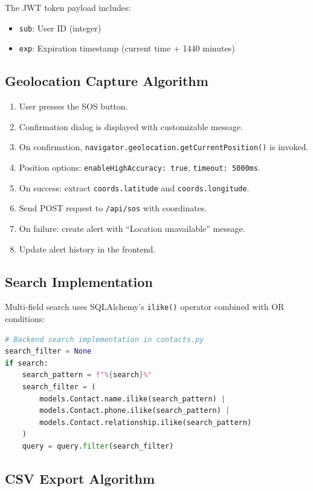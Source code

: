 The JWT token payload includes:
\begin{itemize}
  \item \texttt{sub}: User ID (integer)
  \item \texttt{exp}: Expiration timestamp (current time + 1440 minutes)
\end{itemize}

\subsection{Geolocation Capture Algorithm}

\begin{enumerate}
  \item User presses the SOS button.
  \item Confirmation dialog is displayed with customizable message.
  \item On confirmation, \texttt{navigator.geolocation.getCurrentPosition()} is invoked.
  \item Position options: \texttt{enableHighAccuracy: true}, \texttt{timeout: 5000ms}.
  \item On success: extract \texttt{coords.latitude} and \texttt{coords.longitude}.
  \item Send POST request to \texttt{/api/sos} with coordinates.
  \item On failure: create alert with ``Location unavailable'' message.
  \item Update alert history in the frontend.
\end{enumerate}

\subsection{Search Implementation}

Multi-field search uses SQLAlchemy's \texttt{ilike()} operator combined with OR conditions:

\begin{lstlisting}[language=Python, caption=Multi-field search implementation, label=lst:search]
# Backend search implementation in contacts.py
search_filter = None
if search:
    search_pattern = f"%{search}%"
    search_filter = (
        models.Contact.name.ilike(search_pattern) |
        models.Contact.phone.ilike(search_pattern) |
        models.Contact.relationship.ilike(search_pattern)
    )
    query = query.filter(search_filter)
\end{lstlisting}

\subsection{CSV Export Algorithm}

